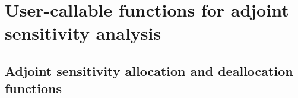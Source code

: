 \section{User-callable functions for adjoint sensitivity analysis}

\subsection{Adjoint sensitivity allocation and deallocation functions}
\label{sss:idaadjinit}

